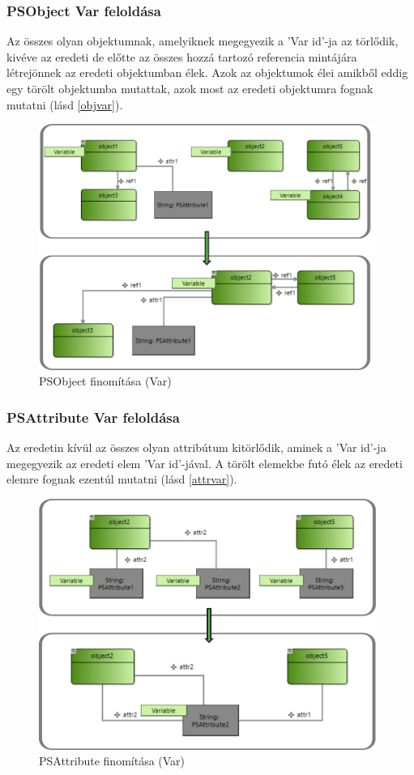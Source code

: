\subsubsection{PSObject Var feloldása}
 Az összes olyan objektumnak, amelyiknek megegyezik a 'Var id'-ja az törlődik, kivéve az eredeti de előtte az összes hozzá tartozó referencia mintájára létrejönnek az eredeti objektumban élek. Azok az objektumok élei amikből eddig egy törölt objektumba mutattak, azok most az eredeti objektumra fognak mutatni (lásd \autoref{objvar}).
\begin{figure}[!ht]
	\centering
	\includegraphics[width=110mm]{figures/objvar.pdf}
	\caption{PSObject finomítása (Var)}
	\label{objvar} 
\end{figure}

\subsubsection{PSAttribute Var feloldása}
Az eredetin kívül az összes olyan attribútum kitörlődik, aminek a 'Var id'-ja megegyezik az eredeti elem 'Var id'-jával. A törölt elemekbe futó élek az eredeti elemre fognak ezentúl mutatni (lásd \autoref{attrvar}).
\begin{figure}[!ht]
	\centering
	\includegraphics[width=110mm]{figures/attrvar.pdf}
	\caption{PSAttribute finomítása (Var)}
	\label{attrvar} 
\end{figure}

